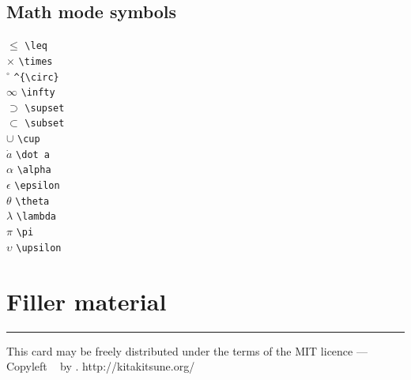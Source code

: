 \documentclass[10pt]{article}
\begin{document}
\begin{multicols}{3}
\subsection{Math mode symbols}
\begin{multicols*}{4}
\( \leq \) \verb|\leq| \\
\( \times \) \verb|\times| \\
\( ^{\circ} \) \verb|^{\circ}| \\
\( \infty \) \verb|\infty| \\
\( \supset \) \verb|\supset| \\
\( \subset \) \verb|\subset| \\
\( \cup \) \verb|\cup| \\
\( \dot a \) \verb|\dot a| \\
\( \alpha \) \verb|\alpha| \\
\( \epsilon \) \verb|\epsilon| \\
\( \theta \) \verb|\theta| \\
\( \lambda \) \verb|\lambda| \\
\( \pi \) \verb|\pi| \\
\( \upsilon \) \verb|\upsilon|
\end{multicols*}

\section{Filler material}

\lipsum

\vfill \hrule\smallskip
{\small This card may be freely distributed under
the terms of the MIT licence ---
Copyleft \textcopyleft\ \thedate{} by \theauthor{}.}
{\small http://kitakitsune.org/}
\end{multicols}
\end{document}
